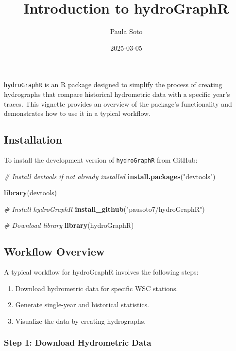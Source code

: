 \documentclass[
]{article}
\title{Introduction to hydroGraphR}
\author{Paula Soto}
\date{2025-03-05}
\newenvironment{Shaded}{\begin{snugshade}}{\end{snugshade}}
\newcommand{\CommentTok}[1]{\textcolor[rgb]{0.56,0.35,0.01}{\textit{#1}}}
\newcommand{\FunctionTok}[1]{\textcolor[rgb]{0.13,0.29,0.53}{\textbf{#1}}}
\newcommand{\NormalTok}[1]{#1}
\newcommand{\StringTok}[1]{\textcolor[rgb]{0.31,0.60,0.02}{#1}}
\providecommand{\tightlist}{%
  \setlength{\itemsep}{0pt}\setlength{\parskip}{0pt}}
\begin{document}
\maketitle

\texttt{hydroGraphR} is an R package designed to simplify the process of
creating hydrographs that compare historical hydrometric data with a
specific year's traces. This vignette provides an overview of the
package's functionality and demonstrates how to use it in a typical
workflow.

\hypertarget{installation}{%
\subsection{Installation}\label{installation}}

To install the development version of \texttt{hydroGraphR} from GitHub:

\begin{Shaded}
\begin{Highlighting}[]
\CommentTok{\# Install devtools if not already installed}
\FunctionTok{install.packages}\NormalTok{(}\StringTok{"devtools"}\NormalTok{)}

\FunctionTok{library}\NormalTok{(devtools)}

\CommentTok{\# Install hydroGraphR}
\FunctionTok{install\_github}\NormalTok{(}\StringTok{"pausoto7/hydroGraphR"}\NormalTok{)}

\CommentTok{\# Download library}
\FunctionTok{library}\NormalTok{(hydroGraphR)}
\end{Highlighting}
\end{Shaded}

\hypertarget{workflow-overview}{%
\subsection{Workflow Overview}\label{workflow-overview}}

A typical workflow for hydroGraphR involves the following steps:

\begin{enumerate}
\def\labelenumi{\arabic{enumi}.}
\tightlist
\item
  Download hydrometric data for specific WSC stations.
\item
  Generate single-year and historical statistics.
\item
  Visualize the data by creating hydrographs.
\end{enumerate}

\hypertarget{step-1-download-hydrometric-data}{%
\subsubsection{Step 1: Download Hydrometric
Data}\label{step-1-download-hydrometric-data}}
\end{document}

